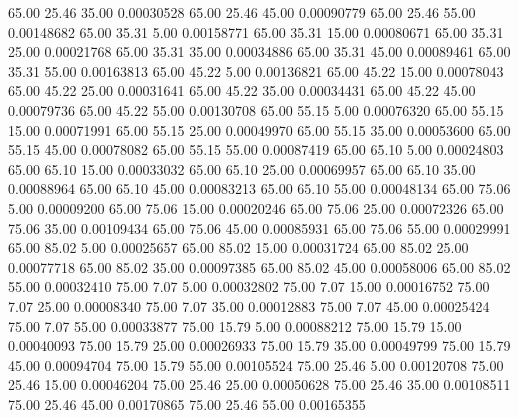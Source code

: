      65.00     25.46     35.00     0.00030528
     65.00     25.46     45.00     0.00090779
     65.00     25.46     55.00     0.00148682
     65.00     35.31      5.00     0.00158771
     65.00     35.31     15.00     0.00080671
     65.00     35.31     25.00     0.00021768
     65.00     35.31     35.00     0.00034886
     65.00     35.31     45.00     0.00089461
     65.00     35.31     55.00     0.00163813
     65.00     45.22      5.00     0.00136821
     65.00     45.22     15.00     0.00078043
     65.00     45.22     25.00     0.00031641
     65.00     45.22     35.00     0.00034431
     65.00     45.22     45.00     0.00079736
     65.00     45.22     55.00     0.00130708
     65.00     55.15      5.00     0.00076320
     65.00     55.15     15.00     0.00071991
     65.00     55.15     25.00     0.00049970
     65.00     55.15     35.00     0.00053600
     65.00     55.15     45.00     0.00078082
     65.00     55.15     55.00     0.00087419
     65.00     65.10      5.00     0.00024803
     65.00     65.10     15.00     0.00033032
     65.00     65.10     25.00     0.00069957
     65.00     65.10     35.00     0.00088964
     65.00     65.10     45.00     0.00083213
     65.00     65.10     55.00     0.00048134
     65.00     75.06      5.00     0.00009200
     65.00     75.06     15.00     0.00020246
     65.00     75.06     25.00     0.00072326
     65.00     75.06     35.00     0.00109434
     65.00     75.06     45.00     0.00085931
     65.00     75.06     55.00     0.00029991
     65.00     85.02      5.00     0.00025657
     65.00     85.02     15.00     0.00031724
     65.00     85.02     25.00     0.00077718
     65.00     85.02     35.00     0.00097385
     65.00     85.02     45.00     0.00058006
     65.00     85.02     55.00     0.00032410
     75.00      7.07      5.00     0.00032802
     75.00      7.07     15.00     0.00016752
     75.00      7.07     25.00     0.00008340
     75.00      7.07     35.00     0.00012883
     75.00      7.07     45.00     0.00025424
     75.00      7.07     55.00     0.00033877
     75.00     15.79      5.00     0.00088212
     75.00     15.79     15.00     0.00040093
     75.00     15.79     25.00     0.00026933
     75.00     15.79     35.00     0.00049799
     75.00     15.79     45.00     0.00094704
     75.00     15.79     55.00     0.00105524
     75.00     25.46      5.00     0.00120708
     75.00     25.46     15.00     0.00046204
     75.00     25.46     25.00     0.00050628
     75.00     25.46     35.00     0.00108511
     75.00     25.46     45.00     0.00170865
     75.00     25.46     55.00     0.00165355
